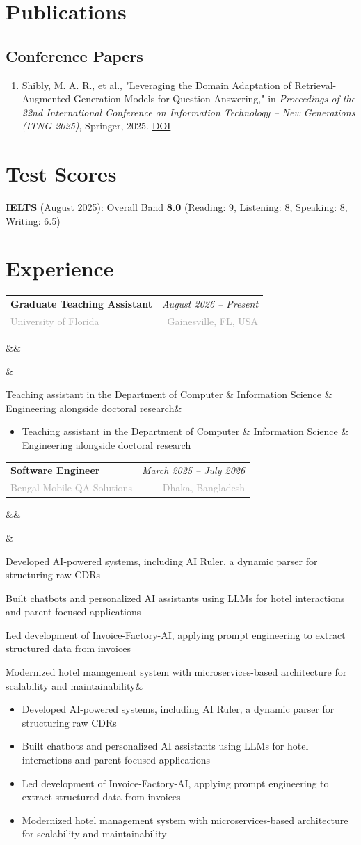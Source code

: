 \documentclass[a4paper,9pt]{article}
\newcommand{\cventry}[6]{%
    \begin{tabularx}{\textwidth}{X r}
        \textbf{#1} & \textit{#2} \\
        \textcolor{darkgray}{#3} & \textcolor{darkgray}{#4} \\
    \end{tabularx}
    \vspace{0pt}
    \ifx&#5&%
    \else
        #5
        \vspace{0pt}
    \fi
    \ifx&#6&%
    \else
        \begin{itemize}[leftmargin=10pt, topsep=0pt, itemsep=0pt, parsep=0pt]
            #6
        \end{itemize}
        \vspace{1pt}
    \fi
}
\newcommand{\cvpublication}[1]{%
    \item #1
}
\begin{document}
\section{Publications}

\subsection{Conference Papers}

\begin{enumerate}[leftmargin=12pt, topsep=0pt, itemsep=0pt, parsep=0pt]
    \cvpublication{Shibly, M. A. R., et al., "Leveraging the Domain Adaptation of Retrieval-Augmented Generation Models for Question Answering," in \textit{Proceedings of the 22nd International Conference on Information Technology – New Generations (ITNG 2025)}, Springer, 2025. \href{https://doi.org/10.1007/978-3-031-89063-5_42}{\textcolor{primaryblue}{DOI}}}
\end{enumerate}

\section{Test Scores}

\textbf{IELTS} (August 2025): Overall Band \textbf{8.0} (Reading: 9, Listening: 8, Speaking: 8, Writing: 6.5)

\section{Experience}

\cventry
{Graduate Teaching Assistant}
{August 2026 -- Present}
{University of Florida}
{Gainesville, FL, USA}
{}
{\item Teaching assistant in the Department of Computer \& Information Science \& Engineering alongside doctoral research}

\cventry
{Software Engineer}
{March 2025 -- July 2026}
{Bengal Mobile QA Solutions}
{Dhaka, Bangladesh}
{}
{\item Developed AI-powered systems, including AI Ruler, a dynamic parser for structuring raw CDRs
\item Built chatbots and personalized AI assistants using LLMs for hotel interactions and parent-focused applications
\item Led development of Invoice-Factory-AI, applying prompt engineering to extract structured data from invoices
\item Modernized hotel management system with microservices-based architecture for scalability and maintainability}
\end{document}
